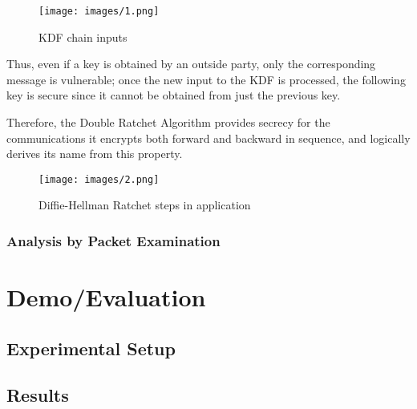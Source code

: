 \documentclass[12pt]{article}
\begin{document}
\begin{figure}[h!]
    \centering
    \texttt{[image: images/1.png]}
    \caption{KDF chain inputs\parencite{website:sigdocdoubleratchet}}
    \label{fig:my_label2}
\end{figure}

\newpage 
\par Thus, even if a key is obtained by an outside party, only the corresponding message is vulnerable; once the new input to the KDF is processed, the following key is secure since it cannot be obtained from just the previous key.
\par Therefore, the Double Ratchet Algorithm provides secrecy for the communications it encrypts both forward and backward in sequence, and logically derives its name from this property. 

\begin{figure}[h!]
    \centering
    \texttt{[image: images/2.png]}
    \caption{Diffie-Hellman Ratchet steps in application \parencite{website:sigdocdoubleratchet}}
    \label{fig:my_label2}
\end{figure}

\newpage 
\subsubsection{Analysis by Packet Examination}

\newpage
\section{Demo/Evaluation}
\subsection{Experimental Setup}

\subsection{Results}
\end{document}
